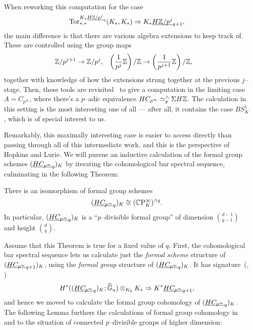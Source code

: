 \begin{remark}
When reworking this computation for the case \[\operatorname{Tor}^{K_* \underline{\smash{H\mathbb Z/p^j}}_{q}}_{*, *}(K_*, K_*) \Rightarrow K_* \underline{\smash{H\mathbb Z/p^j}}_{q+1},\] the main difference is that there are various algebra extensions to keep track of.  These are controlled using the group maps
\begin{align*}
\mathbb Z/p^{j+1} & \to \mathbb Z/p^j, &
\left(\frac{1}{p^j}\mathbb Z\right)/\mathbb Z & \to \left(\frac{1}{p^{j+1}} \mathbb Z\right) / \mathbb Z,
\end{align*}
together with knowledge of how the extensions strung together at the previous $j$--stage.  Then, these tools are revisited~\cite[Theorem 12.4]{RavenelWilsonKthyOfEMSpaces} to give a computation in the limiting case $A = C_{p^\infty}$, where there's a $p$--adic equivalence $HC_{p^\infty} \simeq^\wedge_p \Sigma H\mathbb Z$.  The calculation in this setting is the most interesting one of all --- after all, it contains the case $BS^1_K$, which is of special interest to us.
\end{remark}

Remarkably, this maximally interesting case is easier to access directly than passing through all of this intermediate work, and this is the perspective of Hopkins and Lurie.  We will pursue an inductive calculation of the formal group schemes $(\underline{\smash{HC_{p^\infty}}}_{q})_K$ by iterating the cohomological bar spectral sequence, culminating in the following Theorem:
\begin{theorem}
There is an isomorphism of formal group schemes \[(\underline{\smash{HC_{p^\infty}}}_{q})_K \cong (\mathbb{C}\mathrm P^\infty_K)^{\wedge q}.\]  In particular, $(\underline{\smash{HC_{p^\infty}}}_{q})_K$ is a ``$p$--divisible formal group'' of dimension $\binom{d-1}{q-1}$ and height $\binom{d}{q}$.
\end{theorem}

\noindent Assume that this Theorem is true for a fixed value of $q$.  First, the cohomological bar spectral sequence lets us calculate just the \emph{formal scheme} structure of $(\underline{\smash{HC_{p^\infty}}}_{q+1})_K$, using the \emph{formal group} structure of $(\underline{\smash{HC_{p^\infty}}}_{q})_K$.  It has signature~(\cite{LazarevDeformations}, \cite[Example 2.3.5]{HopkinsLurie}) \[H^*((\underline{\smash{HC_{p^\infty}}}_{q})_K; \widehat{\mathbb G}_a) \otimes_{K_0} K_* \Rightarrow K^* \underline{\smash{HC_{p^\infty}}}_{q+1},\] and hence we moved to calculate the formal group cohomology of $(\underline{\smash{HC_{p^\infty}}}_{q})_K$.   The following Lemma furthers the calculations of formal group cohomology in  and  to the situation of connected $p$--divisible groups of higher dimension:

